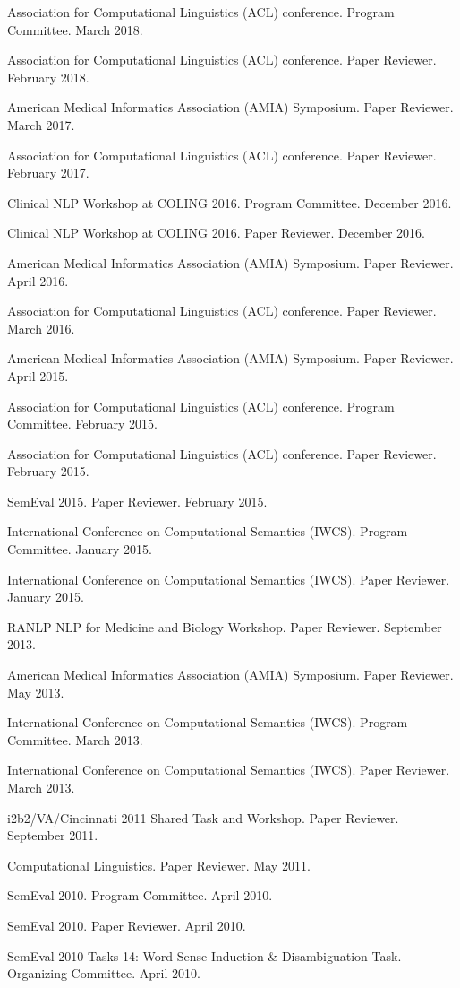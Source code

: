 \documentclass[letterpaper]{article}
\renewenvironment{itemize}{
  \begin{list}{}{
    \setlength{\leftmargin}{1.5em}
  }
}{
  \end{list}
}
\begin{document}
\begin{itemize}
\item Association for Computational Linguistics (ACL) conference. Program Committee. March 2018.
\item Association for Computational Linguistics (ACL) conference. Paper Reviewer. February 2018.
\item American Medical Informatics Association (AMIA) Symposium. Paper Reviewer. March 2017.
\item Association for Computational Linguistics (ACL) conference. Paper Reviewer. February 2017.
\item Clinical NLP Workshop at COLING 2016. Program Committee. December 2016.
\item Clinical NLP Workshop at COLING 2016. Paper Reviewer. December 2016.
\item American Medical Informatics Association (AMIA) Symposium. Paper Reviewer. April 2016.
\item Association for Computational Linguistics (ACL) conference. Paper Reviewer. March 2016.
\item American Medical Informatics Association (AMIA) Symposium. Paper Reviewer. April 2015.
\item Association for Computational Linguistics (ACL) conference. Program Committee. February 2015.
\item Association for Computational Linguistics (ACL) conference. Paper Reviewer. February 2015.
\item SemEval 2015. Paper Reviewer. February 2015.
\item International Conference on Computational Semantics (IWCS). Program Committee. January 2015.
\item International Conference on Computational Semantics (IWCS). Paper Reviewer. January 2015.
\item RANLP NLP for Medicine and Biology Workshop. Paper Reviewer. September 2013.
\item American Medical Informatics Association (AMIA) Symposium. Paper Reviewer. May 2013.
\item International Conference on Computational Semantics (IWCS). Program Committee. March 2013.
\item International Conference on Computational Semantics (IWCS). Paper Reviewer. March 2013.
\item i2b2/VA/Cincinnati 2011 Shared Task and Workshop. Paper Reviewer. September 2011.
\item Computational Linguistics. Paper Reviewer. May 2011.
\item SemEval 2010. Program Committee. April 2010.
\item SemEval 2010. Paper Reviewer. April 2010.
\item SemEval 2010 Tasks 14: Word Sense Induction \& Disambiguation Task. Organizing Committee. April 2010.
\end{itemize}
\end{document}
